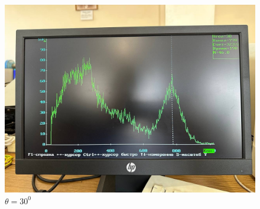 \documentclass[a4paper, 12pt]{article}
\begin{document}
\begin{figure}[H]
\begin{minipage}[h]{0.3\linewidth}
        \includegraphics[width = 1\linewidth]{res/04.jpg}
        \caption{$\theta = 30^0$}
    \end{minipage}
    \end{figure}
\end{document}
